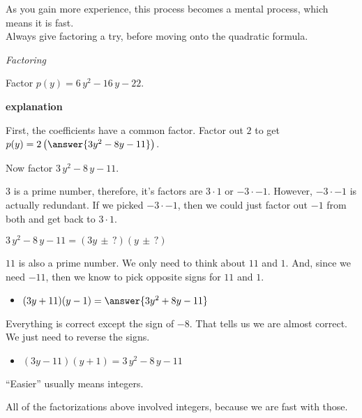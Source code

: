 \documentclass{ximera}
\begin{document}
As you gain more experience, this process becomes a mental process, which means it is fast. \\


Always give factoring a try, before moving onto the quadratic formula. \\






\begin{example} \textit{Factoring}

Factor $p(y) = 6 \, y^2 - 16 \, y - 22$.


\textbf{explanation}


First, the coefficients have a common factor.  Factor out $2$ to get $p(y) = 2 \left( \answer{3 y^2 - 8 y - 11} \right)$.


Now factor $3 \, y^2 - 8 \, y - 11$.



$3$ is a prime number, therefore, it's factors are $3 \cdot 1$ or $-3 \cdot -1$. However, $-3 \cdot -1$ is actually redundant.  If we picked $-3 \cdot -1$, then we could just factor out $-1$ from both and get back to $3 \cdot 1$.


$3 \, y^2 - 8 \, y - 11 = (3y \, \pm \, ?) (y \, \pm \, ?) $


$11$ is also a prime number. We only need to think about $11$ and $1$. And, since we need $-11$, then we know to pick opposite signs for $11$ and $1$.



\begin{itemize}
\item $(3y + 11) (y - 1) = \answer{3 y^2 + 8 y - 11}$
\end{itemize}

Everything is correct except the sign of $-8$. That tells us we are almost correct. We just need to reverse the signs.


\begin{itemize}
\item $(3y - 11) (y + 1) = 3 \, y^2 - 8 \, y - 11$
\end{itemize}





\end{example}


``Easier'' usually means integers.  

All of the factorizations above involved integers, because we are fast with those. \\
\end{document}
